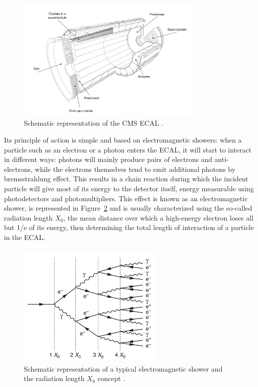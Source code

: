 \documentclass[a4paper, 10pt, openright]{report}
\begin{document}
\begin{figure}[htbp]
\begin{center}
\includegraphics[width=9cm, height=6cm]{figs/CMSEcal.png}
\caption{Schematic representation of the \ac{CMS} \ac{ECAL} \cite{CMSDescription}.}
\label{fig:CMSECAL}
\end{center}
\end{figure}

Its principle of action is simple and based on electromagnetic showers: when a particle such as an electron or a photon enters the \ac{ECAL}, it will start to interact in different ways: photons will mainly produce pairs of electrons and anti-electrons, while the electrons themselves tend to emit additional photons by bremsstrahlung effect. This results in a chain reaction during which the incident particle will give most of its energy to the detector itself, energy measurable using photodetectors and photomultipliers. This effect is known as an electromagnetic shower, is represented in Figure~\ref{fig:EMShowers} and is usually characterized using the so-called radiation length $X_0$, the mean distance over which a high-energy electron loses all but 1/e of its energy, then determining the total length of interaction of a particle in the \ac{ECAL}. 

\begin{figure}[htbp]
\begin{center}
\includegraphics[width=7cm, height=6cm]{figs/EMShowers.png}
\caption{Schematic representation of a typical electromagnetic shower and the radiation length $X_0$ concept \cite{CMSDescription}.}
\label{fig:EMShowers}
\end{center}
\end{figure}
\end{document}
